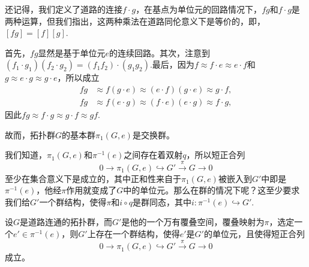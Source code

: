还记得，我们定义了道路的连接$f\cdot g$，在基点为单位元的回路情况下，$fg$和$f\cdot g$是两种运算，但我们指出，这两种乘法在道路同伦意义下是等价的，即，$[fg]=[f][g]$.

首先，$fg$显然是基于单位元$e$的连续回路。其次，注意到$(f_1\cdot g_1)(f_2\cdot g_2)=(f_1f_2)\cdot (g_1g_2)$.最后，因为$f \approx f\cdot e \approx e\cdot f$和$g\approx e\cdot g \approx g\cdot e$，所以成立
\[
\begin{split}
	fg&\approx f(g\cdot e)\approx (e\cdot f)(g\cdot e) \approx g\cdot f,\\
	fg&\approx f(e\cdot g)\approx (f\cdot e)(e\cdot g) \approx f\cdot g,
\end{split}
\]
因此$fg \approx f\cdot g\approx g\cdot f \approx gf$.

\para 故而，拓扑群$G$的基本群$\pi_1(G,e)$是交换群。

\para 我们知道，$\pi_1(G,e)$和$\pi^{-1}(e)$之间存在着双射$q$，所以短正合列
\[
	0\to \pi_1(G,e)\hookrightarrow G' \xrightarrow{\pi} G\to 0
\]
至少在集合意义下是成立的，其中正和性来自于$\pi_1(G,e)$被嵌入到$G'$中即是$\pi^{-1}(e)$，他经$\pi$作用就变成了$G$中的单位元。那么在群的情况下呢？这至少要求我们给$G'$一个群结构，使得$\pi$和$i\circ q$是群同态，其中$i:\pi^{-1}(e)\hookrightarrow G'$.

\begin{thm}
设$G$是道路连通的拓扑群，而$G'$是他的一个万有覆叠空间，覆叠映射为$\pi$，选定一个$e'\in \pi^{-1}(e)$，则$G'$上存在一个群结构，使得$e'$是$G'$的单位元，且使得短正合列
\[
	0\to \pi_1(G,e)\hookrightarrow G' \xrightarrow{\pi} G\to 0
\]
成立。
\end{thm}

